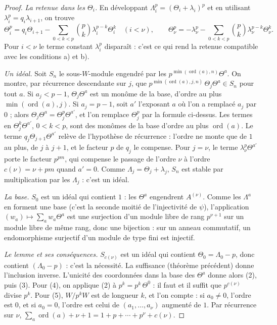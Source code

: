 \begin{proof}
\emph{La retenue dans les $\Theta_i$.} En développant $\Lambda_i^p = (\Theta_i + \lambda_i)^p$ et en utilisant $\lambda_i^p = q_i\lambda_{i+1}$, on trouve
\[
\Theta_i^p = q_i\Theta_{i+1} - \sum_{0<k<p}\binom pk\lambda_i^{p-k}\Theta_i^k \quad (i < \nu), \qquad \Theta_\nu^p = -\lambda_\nu^p - \sum_{0<k<p}\binom pk\lambda_\nu^{p-k}\Theta_\nu^k .
\]
Pour $i < \nu$ le terme constant $\lambda_i^p$ disparaît : c'est ce qui rend la retenue compatible avec les conditions a) et b).

\emph{Un idéal.} Soit $S_n$ le sous-$W$-module engendré par les $p^{\min(\operatorname{ord}(a), n)}\Theta^a$. On montre, par récurrence descendante sur $j$, que $p^{\min(\operatorname{ord}(a), j, n)}\,\Theta_j\Theta^a \in S_n$ pour tout $a$. Si $a_j < p - 1$, $\Theta_j\Theta^a$ est un monôme de la base, d'ordre au plus $\min(\operatorname{ord}(a), j)$. Si $a_j = p - 1$, soit $a'$ l'exposant $a$ où l'on a remplacé $a_j$ par $0$ ; alors $\Theta_j\Theta^a = \Theta_j^p\Theta^{a'}$, et l'on remplace $\Theta_j^p$ par la formule ci-dessus. Les termes en $\Theta_j^k\Theta^{a'}$, $0 < k < p$, sont des monômes de la base d'ordre au plus $\operatorname{ord}(a)$. Le terme $q_j\Theta_{j+1}\Theta^{a'}$ relève de l'hypothèse de récurrence : l'ordre ne monte que de $1$ au plus, de $j$ à $j+1$, et le facteur $p$ de $q_j$ le compense. Pour $j = \nu$, le terme $\lambda_\nu^p\Theta^{a'}$ porte le facteur $p^{pm}$, qui compense le passage de l'ordre $\nu$ à l'ordre $c(\nu) = \nu + pm$ quand $a' = 0$. Comme $\Lambda_j = \Theta_j + \lambda_j$, $S_n$ est stable par multiplication par les $\Lambda_j$ : c'est un idéal.

\emph{La base.} $S_0$ est un idéal qui contient $1$ : les $\Theta^a$ engendrent $A^{(\nu)}$. Comme les $\Lambda^a$ en forment une base (c'est la seconde moitié de l'injectivité de $\psi$), l'application $(w_a) \mapsto \sum_a w_a\Theta^a$ est une surjection d'un module libre de rang $p^{\nu+1}$ sur un module libre de même rang, donc une bijection : sur un anneau commutatif, un endomorphisme surjectif d'un module de type fini est injectif.

\emph{Le lemme et ses conséquences.} $S_{c(\nu)}$ est un idéal qui contient $\Theta_0 = \Lambda_0 - p$, donc contient $(\Lambda_0 - p)$ : c'est la nécessité. La suffisance (théorème précédent) donne l'inclusion inverse. L'unicité des coordonnées dans la base des $\Theta^a$ donne alors (2), puis (3). Pour (4), on applique (2) à $p^k = p^k\,\Theta^0$ : il faut et il suffit que $p^{c(\nu)}$ divise $p^k$. Pour (5), $W/p^kW$ est de longueur $k$, et l'on compte : si $a_0 \neq 0$, l'ordre est $0$, et si $a_0 = 0$, l'ordre est celui de $(a_1, \ldots, a_\nu)$ augmenté de $1$. Par récurrence sur $\nu$, $\sum_a \operatorname{ord}(a) + \nu + 1 = 1 + p + \cdots + p^\nu + c(\nu)$.
\end{proof}

